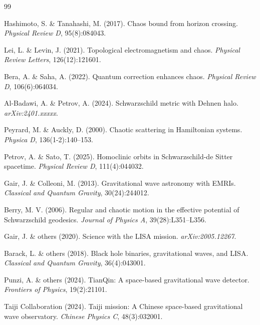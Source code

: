 \documentclass[12pt]{article}
\begin{document}
\begin{thebibliography}{99}

 Hashimoto, S. \& Tanahashi, M. (2017). Chaos bound from horizon crossing. \emph{Physical Review D}, 95(8):084043.

 Lei, L. \& Levin, J. (2021). Topological electromagnetism and chaos. \emph{Physical Review Letters}, 126(12):121601.

 Bera, A. \& Saha, A. (2022). Quantum correction enhances chaos. \emph{Physical Review D}, 106(6):064034.

 Al-Badawi, A. \& Petrov, A. (2024). Schwarzschild metric with Dehnen halo. \emph{arXiv:2401.xxxxx}.

 Peyrard, M. \& Auckly, D. (2000). Chaotic scattering in Hamiltonian systems. \emph{Physica D}, 136(1-2):140--153.

 Petrov, A. \& Sato, T. (2025). Homoclinic orbits in Schwarzschild-de Sitter spacetime. \emph{Physical Review D}, 111(4):044032.

 Gair, J. \& Colleoni, M. (2013). Gravitational wave astronomy with EMRIs. \emph{Classical and Quantum Gravity}, 30(24):244012.

 Berry, M. V. (2006). Regular and chaotic motion in the effective potential of Schwarzschild geodesics. \emph{Journal of Physics A}, 39(28):L351--L356.

 Gair, J. \& others (2020). Science with the LISA mission. \emph{arXiv:2005.12267}.

 Barack, L. \& others (2018). Black hole binaries, gravitational waves, and LISA. \emph{Classical and Quantum Gravity}, 36(4):043001.

 Punzi, A. \& others (2024). TianQin: A space-based gravitational wave detector. \emph{Frontiers of Physics}, 19(2):21101.

 Taiji Collaboration (2024). Taiji mission: A Chinese space-based gravitational wave observatory. \emph{Chinese Physics C}, 48(3):032001.

\end{thebibliography}
\end{document}
